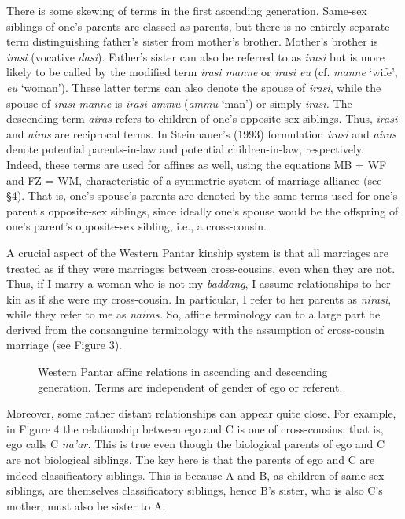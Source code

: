 There is some skewing of terms in the first ascending generation. Same-sex siblings of one's parents are classed as parents, but there is no entirely separate term distinguishing father's sister from mother's brother. Mother's brother is \textit{irasi} (vocative \textit{dasi}). Father's sister can also be referred to as \textit{irasi} but is more likely to be called by the modified term \textit{irasi manne} or \textit{irasi eu} (cf. \textit{manne} `wife', \textit{eu} `woman'). These latter terms can also denote the spouse of \textit{irasi}, while the spouse of \textit{irasi manne} is \textit{irasi ammu} (\textit{ammu} `man') or simply \textit{irasi.} The descending term \textit{airas} refers to children of one's opposite-sex siblings. Thus, \textit{irasi} and \textit{airas} are reciprocal terms. In Steinhauer's (1993) formulation \textit{irasi} and \textit{airas} denote potential parents-in-law and potential children-in-law, respectively. Indeed, these terms are used for affines as well, using the equations MB = WF and FZ = WM, characteristic of a symmetric system of marriage alliance (see {\S}4). That is, one's spouse's parents are denoted by the same terms used for one's parent's opposite-sex siblings, since ideally one's spouse would be the offspring of one's parent's opposite-sex sibling, i.e., a cross-cousin.

  A crucial aspect of the Western Pantar kinship system is that all marriages are treated as if they were marriages between cross-cousins, even when they are not. Thus, if I marry a woman who is not my \textit{baddang}, I assume relationships to her kin as if she were my cross-cousin. In particular, I refer to her parents as \textit{nirasi}, while they refer to me as \textit{nairas.} So, affine terminology can to a large part be derived from the consanguine terminology with the assumption of cross-cousin marriage (see Figure 3).


\begin{figure}
\caption{ Western Pantar affine relations in ascending and descending generation. Terms are independent of gender of ego or referent. }
\end{figure}

Moreover, some rather distant relationships can appear quite close. For example, in Figure 4 the relationship between ego and C is one of cross-cousins; that is, ego calls C \textit{na'ar.} This is true even though the biological parents of ego and C are not biological siblings. The key here is that the parents of ego and C are indeed classificatory siblings. This is because A and B, as children of same-sex siblings, are themselves classificatory siblings, hence B's sister, who is also C's mother, must also be sister to A.

